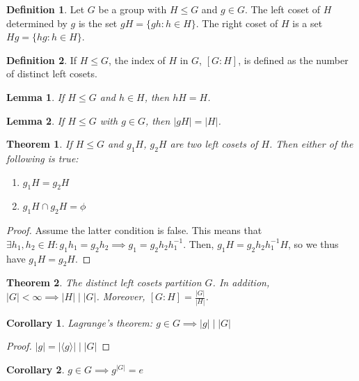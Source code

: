 \documentclass{article}
\theoremstyle{definition}
\newtheorem{definition}{Definition}
\theoremstyle{plain}
\newtheorem{theorem}{Theorem}
\theoremstyle{corollary}
\newtheorem{corollary}{Corollary}
\theoremstyle{lemma}
\newtheorem{lemma}{Lemma}
\begin{document}
\begin{definition}
Let $G$ be a group with $H\leq G$ and $g\in G$. The left coset of $H$ determined by $g$ is the set $gH=\{gh:h\in H\}$. The right coset of $H$ is a set $Hg=\{hg:h\in H\}$.
\end{definition}

\begin{definition}
If $H\leq G$, the index of $H$ in $G$, $[G:H]$, is defined as the number of distinct left cosets.
\end{definition}

\begin{lemma}
If $H\leq G$ and $h\in H$, then $hH=H$.
\end{lemma}

\begin{lemma}
If $H\leq G$ with $g\in G$, then $|gH|=|H|$.
\end{lemma}

\begin{theorem}
If $H\leq G$ and $g_1H$, $g_2H$ are two left cosets of $H$. Then either of the following is true:
\begin{enumerate}
    \item $g_1H=g_2H$
    \item $g_1H\cap g_2H=\phi$
\end{enumerate}
\end{theorem}

\begin{proof}
    Assume the latter condition is false. This means that $\exists h_1,h_2\in H:g_1h_1=g_2h_2\implies g_1=g_2h_2h_1^{-1}$. Then, $g_1H=g_2h_2h_1^{-1}H$, so we thus have $g_1H=g_2H$.
\end{proof}

\begin{theorem}
    The distinct left cosets partition $G$. In addition, $|G|<\infty\implies|H|\mid|G|$. Moreover, $[G:H]=\frac {|G|}{|H|}$.
\end{theorem}

\begin{corollary}
    Lagrange's theorem: $g\in G\implies |g|\mid|G|$
\end{corollary}

\begin{proof}
    $|g|=|\langle g\rangle|\mid|G|$
\end{proof}

\begin{corollary}
$g\in G\implies g^{|G|}=e$
\end{corollary}
\end{document}
